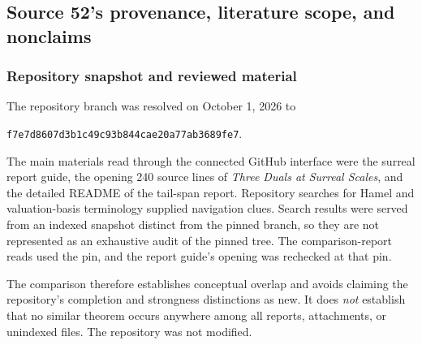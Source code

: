 \documentclass[11pt,letterpaper]{article}
\numberwithin{equation}{section}
\theoremstyle{definition}
\theoremstyle{remark}
\newcommand{\Commit}{f7e7d8607d3b1c49c93b844cae20a77ab3689fe7}
\begin{document}
\subsection{Source 52's provenance, literature scope, and nonclaims}\label{rvs:eu:app:provenance}

\subsubsection{Repository snapshot and reviewed material}
The repository branch was resolved on October 1, 2026 to
\begin{center}\small\texttt{\Commit}.\end{center}
The main materials read through the connected GitHub interface were the surreal report guide, the opening 240 source lines of \emph{Three Duals at Surreal Scales}, and the detailed README of the tail-span report. Repository searches for Hamel and valuation-basis terminology supplied navigation clues. Search results were served from an indexed snapshot distinct from the pinned branch, so they are not represented as an exhaustive audit of the pinned tree. The comparison-report reads used the pin, and the report guide's opening was rechecked at that pin.

The comparison therefore establishes conceptual overlap and avoids claiming the repository's completion and strongness distinctions as new. It does \emph{not} establish that no similar theorem occurs anywhere among all reports, attachments, or unindexed files. The repository was not modified.
\end{document}
